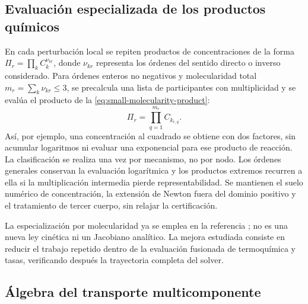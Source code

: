 \documentclass[12pt,a4paper,twoside,openany]{book}
\begin{document}
\subsection{Evaluación especializada de los productos químicos}

En cada perturbación local se repiten productos de concentraciones de la
forma \(\Pi_r=\prod_k C_k^{\nu_{kr}}\), donde \(\nu_{kr}\) representa los
órdenes del sentido directo o inverso considerado. Para órdenes enteros no
negativos y molecularidad total \(m_r=\sum_k\nu_{kr}\leq3\), se precalcula
una lista de participantes con multiplicidad y se evalúa el producto de la \cref{eq:small-molecularity-product}:
\begin{equation}
  \Pi_r=\prod_{q=1}^{m_r} C_{k_{r,q}}.
  \label{eq:small-molecularity-product}
\end{equation}
Así, por ejemplo, una concentración al cuadrado se obtiene con dos factores,
sin acumular logaritmos ni evaluar una exponencial para ese producto de
reacción. La clasificación se realiza una vez por mecanismo, no por nodo.
Los órdenes generales conservan la evaluación logarítmica y los productos
extremos recurren a ella si la multiplicación intermedia pierde
representabilidad. Se mantienen el suelo numérico de concentración, la
extensión de Newton fuera del dominio positivo y el tratamiento de tercer
cuerpo, sin relajar la certificación.

La especialización por molecularidad ya se emplea en la referencia
\cite{CanteraSource32}; no es una nueva ley cinética ni un Jacobiano analítico.
La mejora estudiada consiste en reducir el trabajo repetido dentro de la
evaluación fusionada de termoquímica y tasas, verificando después la trayectoria
completa del solver.

\subsection{Álgebra del transporte multicomponente}
\label{sec:transport-linear-algebra}
\end{document}
